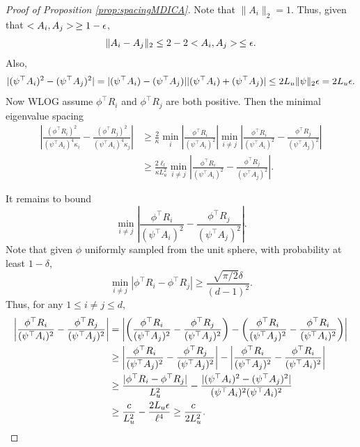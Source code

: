 \begin{proof}[Proof of Proposition \ref{prop:spacingMDICA}]
Note that $\|A_i\|_2 = 1$.  Thus, given that $<A_i, A_j> \,\ge 1-\epsilon$, 
\[
\|A_i - A_j\|_2 \le 2 - 2<A_i, A_j>\, \le \epsilon.
\]
Also, 
\[
|(\psi^{\top}A_i)^2 -(\psi^{\top}A_j)^2 |  =  |(\psi^{\top}A_i) -(\psi^{\top}A_j)| |(\psi^{\top}A_i) +(\psi^{\top}A_j)| \le 2L_u\|\psi\|_2 \epsilon = 2L_u\epsilon. 
\]
Now WLOG assume $\phi^{\top}R_i$ and $\phi^{\top}R_j$ are both positive. Then the minimal eigenvalue spacing 
\begin{align*}
\left\vert \frac{(\phi^{\top}R_i)^2}{(\psi^{\top}A_i)^4\kappa_i}  -  \frac{(\phi^{\top}R_j)^2}{(\psi^{\top}A_i)^4\kappa_j} \right\vert 
& \ge \frac{2}{\kappa} \min_i \left\vert  \frac{\phi^{\top}R_i}{(\psi^{\top}A_i)^2} \right\vert \min_{i\neq j} \left\vert  \frac{\phi^{\top}R_i}{(\psi^{\top}A_i)^2} -  \frac{\phi^{\top}R_j}{(\psi^{\top}A_j)^2}\right\vert 
\\
& \ge \frac{2\ell_l}{\kappa L_u^2} \min_{i\neq j} \left\vert  \frac{\phi^{\top}R_i}{(\psi^{\top}A_i)^2} -  \frac{\phi^{\top}R_j}{(\psi^{\top}A_j)^2} \right\vert. 
\end{align*}

It remains to bound 
\[
\min_{i\neq j} \left\vert  \frac{\phi^{\top}R_i}{(\psi^{\top}A_i)^2} -  \frac{\phi^{\top}R_j}{(\psi^{\top}A_j)^2}\right\vert.
\]
Note that given $\phi$ uniformly sampled from the unit sphere, with probability at least $1-\delta$,
\[
\min_{i\neq j} |\phi^{\top} R_i - \phi^{\top} R_j| \ge \frac{\sqrt{\pi/2}\delta}{(d-1)^2}.
\]
Thus, for any $1\le i\neq j \le d$,
\begin{align*}
 \left\vert  \frac{\phi^{\top}R_i}{(\psi^{\top}A_i)^2} -  \frac{\phi^{\top}R_j}{(\psi^{\top}A_j)^2} \right\vert 
 &
  =  \left\vert \left(\frac{\phi^{\top}R_i}{(\psi^{\top}A_j)^2} -   \frac{\phi^{\top}R_j}{(\psi^{\top}A_j)^2}\right) - \left(\frac{\phi^{\top}R_i}{(\psi^{\top}A_j)^2} - \frac{\phi^{\top}R_i}{(\psi^{\top}A_i)^2} \right) \right\vert \\
  & \ge  \left\vert \frac{\phi^{\top}R_i}{(\psi^{\top}A_j)^2} -   \frac{\phi^{\top}R_j}{(\psi^{\top}A_j)^2} \right\vert - \left\vert \frac{\phi^{\top}R_i}{(\psi^{\top}A_j)^2} - \frac{\phi^{\top}R_i}{(\psi^{\top}A_i)^2} \right\vert \\
  & \ge \frac{\vert \phi^{\top}R_i -  \phi^{\top}R_j \vert }{L_u^2} - \frac{\vert (\psi^{\top}A_i)^2 - (\psi^{\top}A_j)^2 \vert }{(\psi^{\top}A_i)^2(\psi^{\top}A_i)^2} \\
  & \ge \frac{c}{L_u^2} - \frac{2L_u\epsilon}{\ell^4} \ge \frac{c}{2L_u^2}.
\end{align*}
\end{proof}

